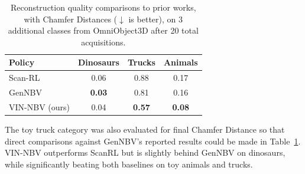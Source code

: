 \begin{table}
\vspace{0.5em}
    \centering
    \begin{tabular}{lccc}
    \toprule
    \textbf{Policy}   & \textbf{Dinosaurs} & \textbf{Trucks} & \textbf{Animals} \\
    \midrule
    Scan-RL \cite{peralta2020next}        & 0.06 & 0.88 & 0.17 \\
    GenNBV \cite{chen2024gennbv}         & \textbf{0.03} & 0.81 & 0.16 \\
    VIN-NBV (ours)       & 0.04   & \textbf{0.57}  & \textbf{0.08}   \\
    \bottomrule
    \end{tabular}
    \vspace{-0.5em}
    \caption{Reconstruction quality comparisons to prior works, with Chamfer Distances ($\downarrow$ is better), on 3 additional classes from OmniObject3D \cite{wu2023omniobject3d} after 20 total acquisitions.}
    \label{table:additional_classes_table}
    \vspace{0.5em}
\end{table}


\vspace{-0.5em}
The toy truck category was also evaluated for final Chamfer Distance so that direct comparisons against GenNBV’s \cite{chen2024gennbv} reported results could be made in Table~\ref{table:additional_classes_table}. VIN-NBV outperforms ScanRL but is slightly behind GenNBV on dinosaurs, while significantly beating both baselines on toy animals and trucks.